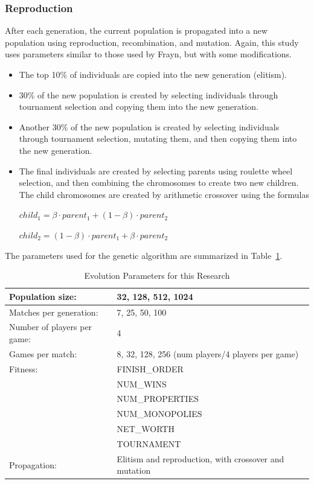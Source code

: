 \subsubsection{Reproduction}

After each generation, the current population is propagated into a new
population using reproduction, recombination, and mutation. Again, this study
uses parameters similar to those used by Frayn, but with some modifications.

\begin{itemize}
  \item {The top 10\% of individuals are copied into the new generation
  (elitism).}
  \item {30\% of the new population is created by selecting individuals through
  tournament selection and copying them into the new generation.}
  \item {Another 30\% of the new population is created by selecting individuals
  through tournament selection, mutating them, and then copying them into the new
  generation.}
  \item {The final individuals are created by selecting parents using
  roulette wheel selection, and then combining the chromosomes to create two
  new children. The child chromosomes are created by arithmetic crossover using
  the formulas 
  
  \(child_{1} = \beta \cdot parent_{1} + (1 - \beta ) \cdot parent_{2}\)

  \(child_{2} = (1 - \beta ) \cdot parent_{1} + \beta \cdot parent_{2}\)}
\end{itemize}

The parameters used for the genetic algorithm are summarized in
Table~\ref{table-evoparams}.

\begin{table}[ht]
\caption{Evolution Parameters for this Research}
\begin{center}
\begin{tabular}{ | l | l | }
  \hline                        
  Population size: & 32, 128, 512, 1024 \\ \hline
  Matches per generation: & 7, 25, 50, 100 \\ \hline
  Number of players per game: & 4 \\ \hline
  Games per match: & 8, 32, 128, 256 (num players/4 players per game) \\ \hline
  Fitness: & FINISH\_ORDER \\ 
           & NUM\_WINS \\
           & NUM\_PROPERTIES \\ 
           & NUM\_MONOPOLIES \\
           & NET\_WORTH \\ 
           & TOURNAMENT \\ \hline
  Propagation: & Elitism and reproduction, with crossover and mutation \\ \hline  
\end{tabular}
\label{table-evoparams}
\end{center}
\end{table}
